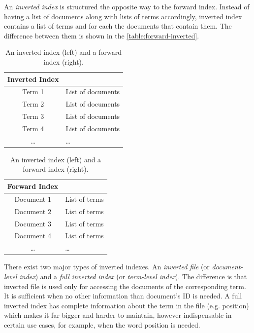 An \emph{inverted index} is structured the opposite way to the forward index. Instead of having a list of documents along with lists of terms accordingly, inverted index contains a list of terms and for each the documents that contain them. The difference between them is shown in the \autoref{table:forward-inverted}.

\begin{table}[t]
\centering
\renewcommand{\arraystretch}{1.4}
\begin{tabular}{c l}
\toprule
Inverted Index\\
\midrule
Term 1 & List of documents \\
Term 2 & List of documents \\
Term 3 & List of documents \\
Term 4 & List of documents \\
\dots & \dots \\
\bottomrule
\end{tabular}
\qquad
\begin{tabular}{c l}
\toprule
Forward Index\\
\midrule
Document 1 & List of terms \\
Document 2 & List of terms \\
Document 3 & List of terms \\
Document 4 & List of terms \\
\dots & \dots \\
\bottomrule
\end{tabular}
\caption{An inverted index (left) and a forward index (right).} 
\label{table:forward-inverted}
\end{table}

There exist two major types of inverted indexes. An \emph{inverted file} (or \emph{document-level index}) and a \emph{full inverted index} (or \emph{term-level index}). The difference is that inverted file is used only for accessing the documents of the corresponding term. It is sufficient when no other information than document's ID is needed. A full inverted index has complete information about the term in the file (e.g. position) which makes it far bigger and harder to maintain, however indispensable in certain use cases, for example, when the word position is needed.

